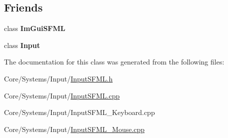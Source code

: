 \subsection*{Friends}
\begin{DoxyCompactItemize}
\item 
\hypertarget{classDCEngine_1_1Systems_1_1InputSFML_a83efc4359a1e6a538392e8844f21fa63}{class {\bfseries Im\-Gui\-S\-F\-M\-L}}\label{classDCEngine_1_1Systems_1_1InputSFML_a83efc4359a1e6a538392e8844f21fa63}

\item 
\hypertarget{classDCEngine_1_1Systems_1_1InputSFML_a9732a2f3b51c8d069f54b1a13fb64c68}{class {\bfseries Input}}\label{classDCEngine_1_1Systems_1_1InputSFML_a9732a2f3b51c8d069f54b1a13fb64c68}

\end{DoxyCompactItemize}


The documentation for this class was generated from the following files\-:\begin{DoxyCompactItemize}
\item 
Core/\-Systems/\-Input/\hyperlink{InputSFML_8h}{Input\-S\-F\-M\-L.\-h}\item 
Core/\-Systems/\-Input/\hyperlink{InputSFML_8cpp}{Input\-S\-F\-M\-L.\-cpp}\item 
Core/\-Systems/\-Input/Input\-S\-F\-M\-L\-\_\-\-Keyboard.\-cpp\item 
Core/\-Systems/\-Input/\hyperlink{InputSFML__Mouse_8cpp}{Input\-S\-F\-M\-L\-\_\-\-Mouse.\-cpp}\end{DoxyCompactItemize}
